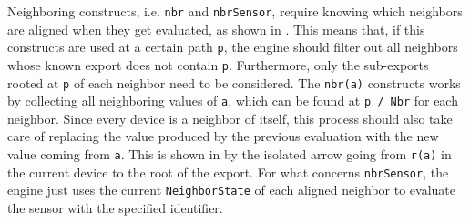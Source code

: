 Neighboring constructs, i.e. \texttt{nbr} and \texttt{nbrSensor}, require knowing which neighbors are aligned when they get evaluated, as shown in .
%
This means that, if this constructs are used at a certain path \texttt{p}, the engine should filter out all neighbors whose known export does not contain \texttt{p}.
%
Furthermore, only the sub-exports rooted at \texttt{p} of each neighbor need to be considered.
%
The \texttt{nbr(a)} constructs works by collecting all neighboring values of \texttt{a}, which can be found at \texttt{p / Nbr} for each neighbor.
%
Since every device is a neighbor of itself, this process should also take care of replacing the value produced by the previous evaluation with the new value coming from \texttt{a}.
%
This is shown in  by the isolated arrow going from \texttt{r(a)} in the current device to the root of the export.
%
For what concerns \texttt{nbrSensor}, the engine just uses the current \texttt{NeighborState} of each aligned neighbor to evaluate the sensor with the specified identifier.
%
